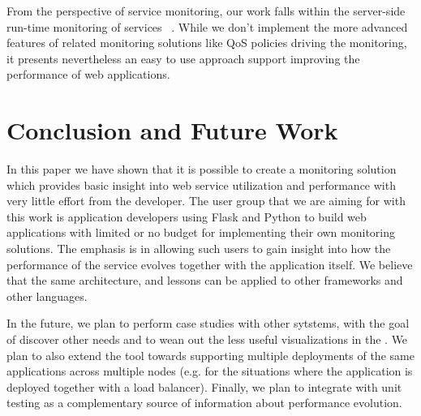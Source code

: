 \documentclass{sig-alternate-05-2015}
\begin{document}
From the perspective of service monitoring, our work falls within the server-side run-time monitoring of services ~\cite{ghezzi2007run}. While we don't implement the more advanced features of related monitoring solutions like QoS policies driving the monitoring, it presents nevertheless an easy to use approach support improving the performance of web applications. 




\section{Conclusion and Future Work}
\label{sec:conclusions}


In this paper we have shown that it is possible to create a monitoring solution which provides basic insight into web service utilization and performance  with very little effort from the developer. The user group that we are aiming for with this work is application developers using Flask and Python to build web applications with limited or no budget for implementing their own monitoring solutions. The emphasis is in allowing such users to gain insight into how the performance of the service evolves together with the application itself. We believe that the same architecture, and lessons can be applied to other frameworks and other languages.

In the future, we plan to perform case studies with other sytstems, with the goal of discover other needs and to wean out the less useful visualizations in the \tool. We plan to also extend the tool towards supporting multiple deployments of the same applications across multiple nodes (e.g. for the situations where the application is deployed together with a load balancer). Finally, we plan to integrate \tool with unit testing as a complementary source of information about performance evolution.







\end{document}
